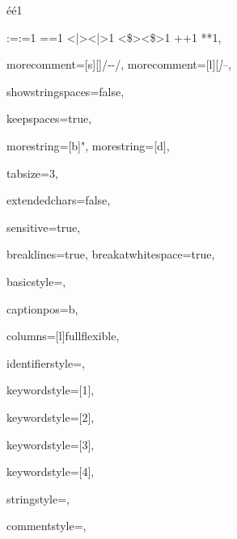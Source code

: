 {  {é}{{\'e}}1

  {:=}{{\textcolor{symbolcolor}{:=}}}1
  {=}{{\textcolor{symbolcolor}{=}}}1
  {<|>}{{\textcolor{symbolcolor}{<|>}}}1
  {<\$>}{{\textcolor{symbolcolor}{<\$>}}}1
  {+}{{\textcolor{symbolcolor}{+}}}1
  {*}{{\textcolor{symbolcolor}{*}}}1,

  morecomment=[s][\color{commentcolor}]{/-}{-/},
  morecomment=[l][\itshape \color{commentcolor}]{--},

  showstringspaces=false,

  keepspaces=true,

  morestring=[b]",
  morestring=[d],

  tabsize=3,

  extendedchars=false,

  sensitive=true,

  breaklines=true,
  breakatwhitespace=true,

  basicstyle=\ttfamily\small,

  captionpos=b,

  columns=[l]fullflexible,

  identifierstyle={\ttfamily\color{black}},

  keywordstyle=[1]{\ttfamily\color{keywordcolor}},

  keywordstyle=[2]{\ttfamily\color{sortcolor}},

  keywordstyle=[3]{\ttfamily\color{tacticcolor}},

  keywordstyle=[4]{\ttfamily\color{attributecolor}},

  stringstyle=\ttfamily,

  commentstyle={\ttfamily\footnotesize },

}
